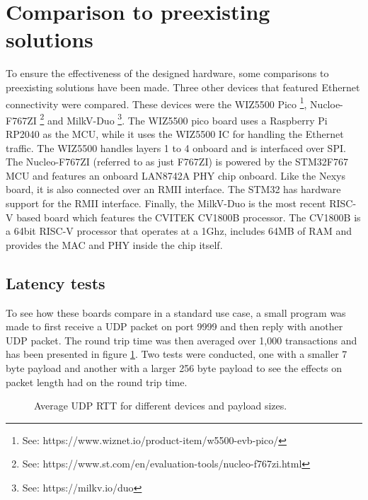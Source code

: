 \section{Comparison to preexisting solutions}

To ensure the effectiveness of the designed hardware, some comparisons to preexisting solutions have been made. Three other devices that featured Ethernet connectivity were compared. These devices were the WIZ5500 Pico \footnote[1]{See: https://www.wiznet.io/product-item/w5500-evb-pico/}, Nucloe-F767ZI \footnote[2]{See: https://www.st.com/en/evaluation-tools/nucleo-f767zi.html} and MilkV-Duo \footnote[3]{See: https://milkv.io/duo}. The WIZ5500 pico board uses a Raspberry Pi RP2040 as the MCU, while it uses the WIZ5500 IC for handling the Ethernet traffic. The WIZ5500 handles layers 1 to 4 onboard and is interfaced over SPI. The Nucleo-F767ZI (referred to as just F767ZI) is powered by the STM32F767 MCU and features an onboard LAN8742A PHY chip onboard. Like the Nexys board, it is also connected over an RMII interface. The STM32 has hardware support for the RMII interface. Finally, the MilkV-Duo is the most recent RISC-V based board which features the CVITEK CV1800B processor. The CV1800B is a 64bit RISC-V processor that operates at a 1Ghz, includes 64MB of RAM and provides the MAC and PHY inside the chip itself.

\subsection{Latency tests}
To see how these boards compare in a standard use case, a small program was made to first receive a UDP packet on port 9999 and then reply with another UDP packet. The round trip time was then averaged over 1,000 transactions and has been presented in figure \ref{fig:avg_udp_rtt}. Two tests were conducted, one with a smaller 7 byte payload and another with a larger 256 byte payload to see the effects on packet length had on the round trip time. 

\begin{figure}[ht]
    \centering
    \caption{Average UDP RTT for different devices and payload sizes.}
    \label{fig:avg_udp_rtt}
    \end{figure}
    
